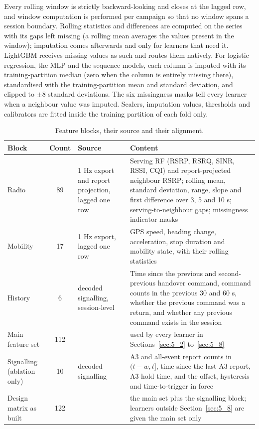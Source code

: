 Every rolling window is strictly backward-looking and closes at the lagged row, and window computation is performed per campaign so that no window spans a session boundary. Rolling statistics and differences are computed on the series with its gaps left missing (a rolling mean averages the values present in the window); imputation comes afterwards and only for learners that need it. LightGBM receives missing values as such and routes them natively. For logistic regression, the MLP and the sequence models, each column is imputed with its training-partition median (zero when the column is entirely missing there), standardised with the training-partition mean and standard deviation, and clipped to $\pm 8$ standard deviations. The six missingness masks tell every learner when a neighbour value was imputed. Scalers, imputation values, thresholds and calibrators are fitted inside the training partition of each fold only.


\begin{table}[htbp]
\centering
\caption{Feature blocks, their source and their alignment.}
\label{tab:4_3}
\vspace{0.4em}
\singlespacing
\small
\begin{tabularx}{\linewidth}{l c p{3.8cm} X}
\toprule
\textbf{Block} & \textbf{Count} & \textbf{Source} & \textbf{Content} \\
\midrule
Radio & 89 & 1 Hz export and report projection, lagged one row & Serving RF (RSRP, RSRQ, SINR, RSSI, CQI) and report-projected neighbour RSRP; rolling mean, standard deviation, range, slope and first difference over 3, 5 and 10 s; serving-to-neighbour gaps; missingness indicator masks \\
Mobility & 17 & 1 Hz export, lagged one row & GPS speed, heading change, acceleration, stop duration and mobility state, with their rolling statistics \\
History & 6 & decoded signalling, session-level & Time since the previous and second-previous handover command, command counts in the previous 30 and 60 s, whether the previous command was a return, and whether any previous command exists in the session \\
Main feature set & 112 &  & used by every learner in Sections~\ref{sec:5_2} to~\ref{sec:5_8} \\
Signalling (ablation only) & 10 & decoded signalling & A3 and all-event report counts in $(t-w, t]$, time since the last A3 report, A3 hold time, and the offset, hysteresis and time-to-trigger in force \\
Design matrix as built & 122 &  & the main set plus the signalling block; learners outside Section~\ref{sec:5_8} are given the main set only \\
\bottomrule
\end{tabularx}
\end{table}

